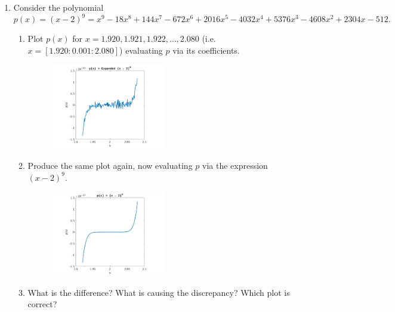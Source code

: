 \documentclass[a4paper,10pt]{article}
\begin{document}
\begin{enumerate}[label = \arabic*.)]
\begin{enumerate}[label = \roman*.]
        \end{enumerate}
    
    \newpage
    \item Consider the polynomial
        \[
            p(x) = (x - 2)^9  = x^9 - 18x^8 + 144x^7 - 672x^6 + 2016x^5 - 4032x^4 + 5376x^3 - 4608x^2 + 2304x - 512.
        \]
        \begin{enumerate}[label = \roman*.]
            \item Plot $p(x)$ for $x = 1.920, 1.921, 1.922, \ldots, 2.080$ (i.e. $x = [1.920 : 0.001 : 2.080]$) evaluating $p$ via its coefficients.
            
            \begin{figure}[h!]
                \centering
                \includegraphics[width = 0.5\textwidth]{images/2.i.png}
                \label{fig:2.i}
            \end{figure}
            
            \item Produce the same plot again, now evaluating $p$ via the expression $(x - 2)^9$.
            
            \begin{figure}[h!]
                \centering
                \includegraphics[width = 0.5\textwidth]{images/2.ii.png}
                \label{fig:2.ii}
            \end{figure}
            
            \item What is the difference? What is causing the discrepancy? Which plot is correct?
            

\end{enumerate}
\end{enumerate}
\end{document}
